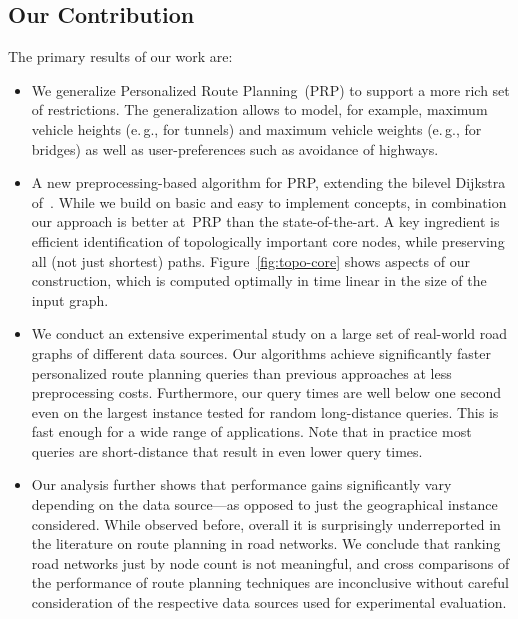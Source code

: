 \documentclass{sig-alternate}
\newcommand{\eg}{e.\,g.\xspace}
\begin{document}
\subsection{Our Contribution}

The primary results of our work are:

\begin{itemize}

\item We generalize Personalized Route Planning~(PRP) to support a more rich set of restrictions. The generalization allows to model, for example, maximum vehicle heights (\eg, for tunnels) and maximum vehicle weights (\eg, for bridges) as well as user-preferences such as avoidance of highways. 

\item A new preprocessing-based algorithm for PRP, extending the bilevel Dijkstra of~\cite{sww-daola-00}.
While we build on basic and easy to implement concepts, in combination our approach is better at~PRP than the state-of-the-art. A key ingredient is efficient identification of topologically important core nodes, 
while preserving all (not just shortest) paths. 
Figure~\ref{fig:topo-core} shows aspects of our construction, which is computed optimally in time linear in the size of the input graph. 


\item We conduct an extensive experimental study on a large set of real-world road graphs of different data sources. 
Our algorithms achieve significantly faster personalized route planning queries than previous approaches at less preprocessing costs.
 Furthermore, our query times are well below one second even on the largest instance tested for random long-distance queries. This is fast enough for a wide range of applications. Note that in practice most queries are short-distance that result in even lower query times.



\item Our analysis further shows that performance gains significantly vary depending on the data source---as opposed to just the geographical instance considered. 
While observed before, overall 
it is surprisingly underreported in the literature on route planning in road networks. 
We conclude that ranking road networks just by node count is not meaningful, and cross comparisons of the performance of route planning techniques are inconclusive without careful consideration of the respective data sources used for experimental evaluation.





\end{itemize}
 
\end{document}
